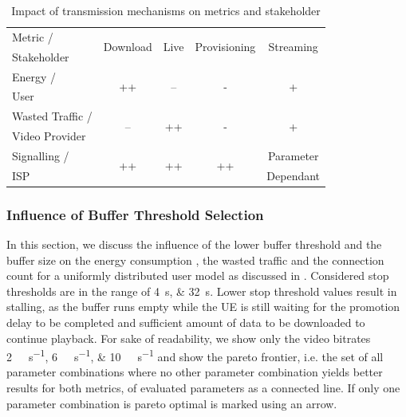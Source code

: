 \begin{table}
  \centering
  \begin{tabular}{lcccc}
    \toprule
    Metric /& \multirow{2}{*}{Download} & \multirow{2}{*}{Live} & \multirow{2}{*}{Provisioning} & \multirow{2}{*}{Streaming}\\
    Stakeholder & & & &\\
    \midrule
    Energy /       & \multirow{2}{*}{++}       & \multirow{2}{*}{--}   & \multirow{2}{*}{-} & \multirow{2}{*}{+}\\
    User & & & &\\
    Wasted Traffic / & \multirow{2}{*}{--} & \multirow{2}{*}{++} & \multirow{2}{*}{-} & \multirow{2}{*}{+} \\
    Video Provider & & & &\\
    Signalling /& \multirow{2}{*}{++} & \multirow{2}{*}{++} & \multirow{2}{*}{++} & Parameter\\
    \gls{ISP} & & & &Dependant\\
    \bottomrule
  \end{tabular}
  \caption{Impact of transmission mechanisms on metrics and stakeholder}
  \label{tab:application:lte_video:trade_offs:mechanism_selection:lessons_learned}
\end{table}

\subsubsection*{Influence of Buffer Threshold Selection}\label{sec:application:lte_video:trade_offs:buffer_threshold_influence}

In this section, we discuss the influence of the lower buffer threshold \bufferlower and the buffer size \buffersize on the energy consumption \power, the wasted traffic \meanwastedtraffic and the connection count \connectioncount for a uniformly distributed user model as discussed in .
Considered stop thresholds are in the range of \SIlist{4;32}{\second}.
Lower stop threshold values result in stalling, as the buffer runs empty while the \gls{UE} is still waiting for the promotion delay to be completed and sufficient amount of data to be downloaded to continue playback.
For sake of readability, we show only the video bitrates \SIlist{2;6;10}{\mega\bit\per\second} and show the pareto frontier, i.e. the set of all parameter combinations where no other parameter combination yields better results for both metrics, of evaluated parameters as a connected line.
If only one parameter combination is pareto optimal is marked using an arrow.

